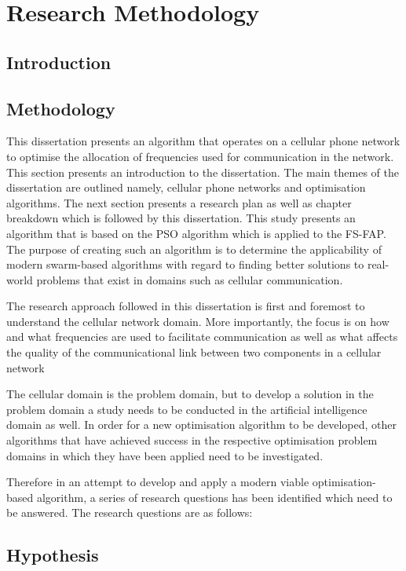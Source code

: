 \chapter{Research Methodology}
\section{Introduction}
\section{Methodology}
This dissertation presents an algorithm that operates on a cellular phone network to optimise the allocation of frequencies used for communication in the network.
This section presents an introduction to the dissertation. The main themes of the dissertation are outlined namely, cellular phone networks and optimisation algorithms. The next section presents a research plan as well as chapter breakdown which is followed by this dissertation.
This study presents an algorithm that is based on the \gls{PSO} algorithm which is applied to the \gls{FS-FAP}. The purpose of creating such an algorithm is to determine the applicability of modern swarm-based algorithms with regard to finding better solutions to real-world problems that exist in domains such as cellular communication.

The research approach followed in this dissertation is first and foremost to understand the cellular network domain. More importantly, the focus is on how and what frequencies are used to facilitate communication as well as what affects the quality of the communicational link between two components in a cellular network 

The cellular domain is the problem domain, but to develop a solution in the problem domain a study needs to be conducted in the artificial intelligence domain as well. In order for a new optimisation algorithm to be developed, other algorithms that have achieved success in the respective optimisation problem domains in which they have been applied need to be investigated.

Therefore in an attempt to develop and apply a modern viable optimisation-based algorithm, a series of research questions has been identified which need to be answered. The research questions are as follows:
\section{Hypothesis}
